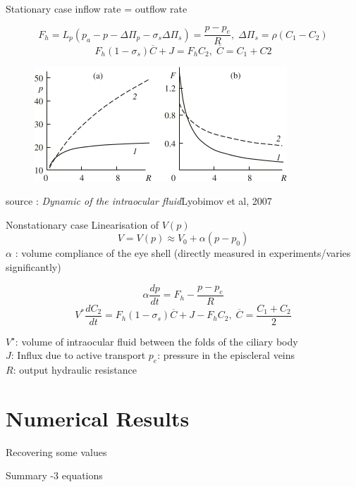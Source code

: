 \begin{frame}{Stationary case}
 inflow rate = outflow rate
\begin{block}{}
\[
F_h = L_p \left(p_a-p-\Delta \Pi_p - \sigma_s \Delta\Pi_s\right) = \frac{p - p_e}{R}, \; \Delta \Pi_s = \rho(C_1-C_2)
\]
\[
F_h (1 - \sigma_s) \overline{C} + J = F_hC_2 , \; \overline{C}= C_1+C2
\]

\end{block}
\begin{figure}[H]
\includegraphics[scale=1]{images/courbes_pr_fr}
\end{figure}
\tiny{source : \textit{Dynamic of the intraocular fluid}Lyobimov et al, 2007}
\end{frame}

\begin{frame}{Nonstationary case}
Linearisation of $V(p)$
\[
V = V(p) \approx V_0 + \alpha (p-p_0)
\]
$\alpha$ : volume compliance of the eye shell (directly measured in experiments/varies significantly)

\begin{block}{}
\[
 \alpha \frac{dp}{dt}=F_{h}-\frac{p-p_e}{R}
 \]
\[
 V^{\ast} \frac{dC_{2}}{dt}= F_h(1-\sigma_s)\overline{C} + J - F_hC_2,\; \overline{C}= \frac{C_1+C_2}{2}
 \]
\end{block}

$V^\star$: volume of intraocular fluid between the folds of the ciliary body\\
$J$: Influx due to active transport
$p_e$: pressure in the episcleral veins\\
$R$: output hydraulic resistance\\

\end{frame}

\section{Numerical Results}
\frame{\sectionpage}
\begin{frame}

\end{frame}
\begin{frame}

\end{frame}
\begin{frame}{Recovering some values}
\end{frame}

\begin{frame}{Summary}
-3 equations
\end{frame}


